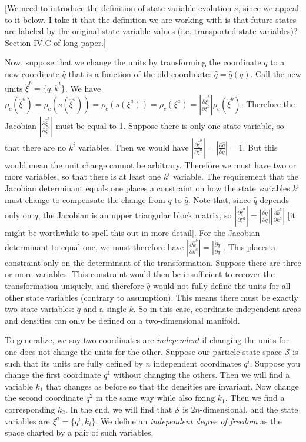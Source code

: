 \documentclass[letterpaper]{article}
\begin{document}
[We need to introduce the definition of state variable evolution $s$, since we appeal to it below. I take it that the definition we are working with is that future states are labeled by the original state variable values (i.e. transported state variables)? Section IV.C of long paper.]

Now, suppose that we change the units by transforming the coordinate $q$ to a new coordinate $\hat{q}$ that is a function of the old coordinate: $\hat{q}=\hat{q}(q)$. Call the new units $\hat{\xi}^b = \{ \hat{q}, \hat{k}^i\}$. We have $\rho_c(\hat{\xi}^b)=\rho_c(s(\hat{\xi}^b))=\rho_c(s(\xi^a))=\rho_c(\xi^a) = \left|\frac{\partial \hat{\xi}^b}{\partial \xi^a} \right| \rho_c(\hat\xi^b)$. Therefore the Jacobian $\left|\frac{\partial \hat{\xi}^b}{\partial \xi^a} \right|$ must be equal to 1. Suppose there is only one state variable, so that there are no $k^i$ variables. Then we would have $\left|\frac{\partial \hat{\xi}^b}{\partial \xi^a} \right| = \left|\frac{\partial \hat q}{\partial q} \right| = 1$. But this would mean the unit change cannot be arbitrary. Therefore we must have two or more variables, so that there is at least one $k^i$ variable. The requirement that the Jacobian determinant equals one places a constraint on how the state variables $k^i$ must change to compensate the change from $q$ to $\hat q$. Note that, since $\hat{q}$ depends only on $q$, the Jacobian is an upper triangular block matrix, so $\left|\frac{\partial \hat{\xi}^b}{\partial \xi^a} \right| = \left|\frac{\partial \hat q}{\partial q} \right|\left|\frac{\partial \hat{k}^b}{\partial k^a} \right|$ [it might be worthwhile to spell this out in more detail].  For the Jacobian determinant to equal one, we must therefore have $\left|\frac{\partial \hat{k}^b}{\partial k^a} \right| = \left|\frac{\partial q}{\partial \hat q} \right|$. This places a constraint only on the determinant of the transformation. Suppose there are three or more variables. This constraint would then be insufficient to recover the transformation uniquely, and therefore $\hat q$  would not fully define the units for all other state variables (contrary to assumption). This means there must be exactly two state variables: $q$ and a single $k$. So in this case, coordinate-independent areas and densities can only be defined on a two-dimensional manifold.

To generalize, we say two coordinates are \textit{independent} if changing the units for one does not change the units for the other. Suppose our particle state space $\mathcal{S}$ is such that its units are fully defined by $n$ independent coordinates $q^i$. Suppose you change the first coordinate $q^1$ without changing the others. Then we will find a variable $k_1$ that changes as before so that the densities are invariant. Now change the second coordinate $q^2$ in the same way while also fixing $k_1$. Then we find a corresponding $k_2$. In the end, we will find that $\mathcal{S}$ is $2n$-dimensional, and the state variables are $\xi^a = \{ q^i, k_i \}$. We define an \textit{independent degree of freedom} as the space charted by a pair of such variables.
\end{document}

